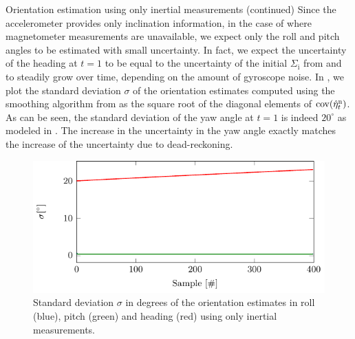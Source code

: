 \begin{myexample}{Orientation estimation using only inertial measurements (continued)}
\label{ex:oriEst-noMagDataCov}%
Since the accelerometer provides only inclination information, in the case of  where magnetometer measurements are unavailable, we expect only the roll and pitch angles to be estimated with small uncertainty. In fact, we expect the uncertainty of the heading at $t = 1$ to be equal to the uncertainty of the initial $\Sigma_\text{i}$ from  and to steadily grow over time, depending on the amount of gyroscope noise. In , we plot the standard deviation $\sigma$ of the orientation estimates computed using the smoothing algorithm from  as the square root of the diagonal elements of $\operatorname{cov} ( \hat{\eta}_t^\text{n})$. As can be seen, the standard deviation of the yaw angle at $t = 1$ is indeed $20^\circ$ as modeled in . The increase in the uncertainty in the yaw angle exactly matches the increase of the uncertainty due to dead-reckoning. 

\begin{figure}
	\centering
	\includegraphics[scale = 1]{figure4_9.pdf}
    	\caption{Standard deviation $\sigma$ in degrees of the orientation estimates in roll (blue), pitch (green) and heading (red) using only inertial measurements.}
	\label{fig:oriEst-uncertaintySmoothingNoMag}
\end{figure}
\end{myexample}

